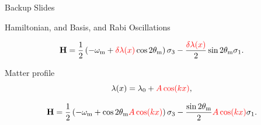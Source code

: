 
\begin{frame}

\begin{tcolorbox}
   \centering
   Backup Slides
\end{tcolorbox}

\end{frame}

\begin{frame}{Hamiltonian, and Basis, and Rabi Oscillations}



\begin{tcolorbox}[title=Hamiltonian in Background Matter Basis]
    \begin{equation*}
    \mathbf {H} = \frac{1}{2}\left( - \omega_{\mathrm{m}} + {\color{red}\delta \lambda(x)} \cos 2\theta_{\mathrm{m}} \right) \sigma_3 - \frac{  {\color{red}\delta \lambda(x)}  }{2} \sin 2\theta_{\mathrm{m}} \sigma_1.
\end{equation*}
\end{tcolorbox}


Matter profile
\begin{equation*}
    \lambda(x) = \lambda_0 + {\color{red}A \cos (k x)},
\end{equation*}


\begin{equation*}
    \mathbf {H} = \frac{1}{2}\left( - \omega_{\mathrm{m}} +  \cos 2\theta_{\mathrm{m}}{\color{red}A\cos(kx)} \right) \sigma_3 - \frac{  \sin 2\theta_{\mathrm{m} }  }{2}{\color{red}A \cos(kx)}  \sigma_1.
\end{equation*}





\end{frame}


